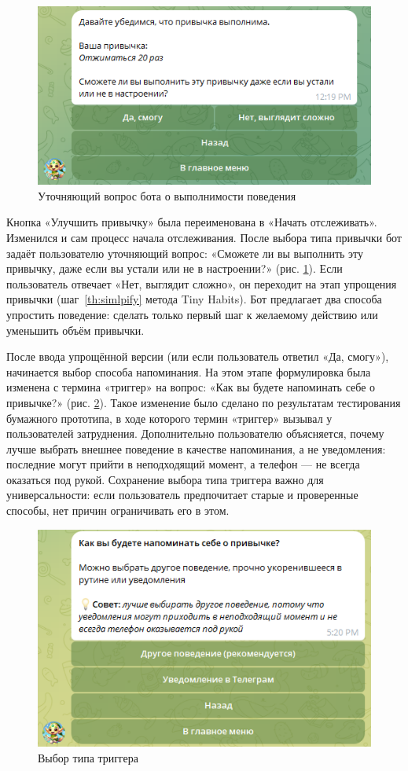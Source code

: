 \documentclass[pdflatex,sn-mathphys-num]{sn-jnl}%
\theoremstyle{thmstyleone}%
\theoremstyle{thmstyletwo}%
\theoremstyle{thmstylethree}%
\begin{document}
\begin{figure}
    \centering
    \includegraphics[width=0.6\linewidth]{figures/Bot/bot_simplify.png}
    \caption{Уточняющий вопрос бота о выполнимости поведения}
    \label{fig:bot_simplify}
\end{figure}

Кнопка «Улучшить привычку» была переименована в «Начать отслеживать». Изменился и сам процесс начала отслеживания. После выбора типа привычки бот задаёт пользователю уточняющий вопрос: «Сможете ли вы выполнить эту привычку, даже если вы устали или не в настроении?» (рис. \ref{fig:bot_simplify}). Если пользователь отвечает «Нет, выглядит сложно», он переходит на этап упрощения привычки (шаг~\ref{th:simlpify} метода Tiny Habits). Бот предлагает два способа упростить поведение: сделать только первый шаг к желаемому действию или уменьшить объём привычки. 

После ввода упрощённой версии (или если пользователь ответил «Да, смогу»), начинается выбор способа напоминания. На этом этапе формулировка была изменена с термина «триггер» на вопрос: «Как вы будете напоминать себе о привычке?» (рис. \ref{fig:bot_trigger_type}). Такое изменение было сделано по результатам тестирования бумажного прототипа, в ходе которого термин «триггер» вызывал у пользователей затруднения. Дополнительно пользователю объясняется, почему лучше выбрать внешнее поведение в качестве напоминания, а не уведомления: последние могут прийти в неподходящий момент, а телефон — не всегда оказаться под рукой. Сохранение выбора типа триггера важно для универсальности: если пользователь предпочитает старые и проверенные способы, нет причин ограничивать его в этом.

\begin{figure}
    \centering
    \includegraphics[width=0.6\linewidth]{figures/Bot/bot_trigger_type.png}
    \caption{Выбор типа триггера}
    \label{fig:bot_trigger_type}
\end{figure}
\end{document}
